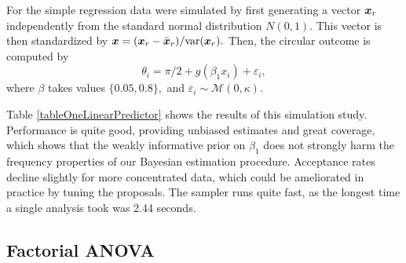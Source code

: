 For the simple regression data were simulated by first generating a vector \( \boldsymbol{x}_r \) independently from the standard normal distribution \( N(0, 1).\) This vector is then standardized by \( \boldsymbol{x} = (\boldsymbol{x}_r - \bar{\boldsymbol{x}}_r) / \text{var} (\boldsymbol{x}_r).\) Then, the circular outcome is computed by
\begin{equation}
\theta_i = \pi/2 + g \left(\beta_1 x_i\right) + \varepsilon_i,
\end{equation}
where \( \beta \) takes values \( \{ 0.05, 0.8 \},\) and \( \varepsilon_i \sim \mathcal{M}(0, \kappa).\)

Table \ref{tableOneLinearPredictor} shows the results of this simulation study. Performance is quite good, providing unbiased estimates and great coverage, which shows that the weakly informative prior on \( \beta_1 \) does not strongly harm the frequency properties of our Bayesian estimation procedure. Acceptance rates decline slightly for more concentrated data, which could be ameliorated in practice by tuning the proposals. The sampler runs quite fast, as the longest time a single analysis took was 2.44 seconds.

\subsection{Factorial ANOVA}

\label{FacANOVA}

